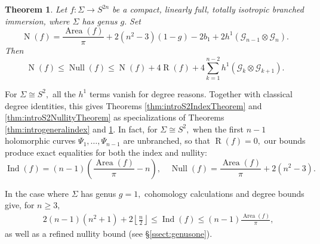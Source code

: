 \documentclass[11pt]{article}
\newtheorem{theorem}{Theorem}[section]
\theoremstyle{definition}
\numberwithin{equation}{section}
\begin{document}
\begin{theorem}\label{thm:introgeneralnull}
    Let $f: \Sigma \to S^{2n}$ be a compact, linearly full, totally isotropic branched immersion, where $\Sigma$ has genus $g.$ Set
    \begin{equation*}
        \operatorname{N}(f) = \frac{\operatorname{Area}(f)}{\pi} + 2(n^2-3)(1-g) -2b_1 + 2 h^1(\mathcal{G}_{n-1} \otimes \mathcal{G}_n).
    \end{equation*}
    Then
    \begin{equation*}
        \operatorname{N}(f) \leq \operatorname{Null}(f) \leq \operatorname{N}(f) + 4 \operatorname{R}(f) + 4 \sum_{k=1}^{n-2} h^1(\mathcal{G}_k \otimes \mathcal{G}_{k+1}).
    \end{equation*}
\end{theorem}

For $\Sigma \cong S^2,$ all the $h^1$ terms vanish for degree reasons. Together with classical degree identities, this gives Theorems \ref{thm:introS2IndexTheorem} and \ref{thm:introS2NullityTheorem} as specializations of Theorems \ref{thm:introgeneralindex} and \ref{thm:introgeneralnull}. In fact, for $\Sigma \cong S^2,$ when the first $n-1$ holomorphic curves $\Psi_1, \ldots, \Psi_{n-1}$ are unbranched, so that $\operatorname{R}(f) = 0,$ our bounds produce exact equalities for both the index and nullity:
\begin{equation*}
    \operatorname{Ind}(f) = (n-1)\left(\frac{\operatorname{Area}(f)}{\pi}-n\right), \quad \operatorname{Null}(f) = \frac{\operatorname{Area}(f)}{\pi}+2(n^2-3).
\end{equation*}

In the case where $\Sigma$ has genus $g=1,$ cohomology calculations and degree bounds give, for $n \geq 3,$
\begin{equation*}
\begin{aligned}
    & 2(n-1)(n^2+1) + 2 \left\lfloor \frac{n}{2} \right\rfloor \leq \operatorname{Ind}(f) \leq (n-1)\frac{\operatorname{Area}(f)}{\pi},
\end{aligned} 
\end{equation*}
as well as a refined nullity bound (see \S\ref{ssect:genusone}).
\end{document}
